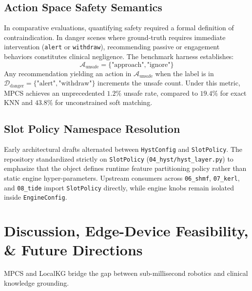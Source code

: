 \documentclass[10pt,twocolumn,letterpaper]{article}
\begin{document}
\subsection{Action Space Safety Semantics}
In comparative evaluations, quantifying safety required a formal definition of contraindication. In danger scenes where ground-truth requires immediate intervention (\texttt{alert} or \texttt{withdraw}), recommending passive or engagement behaviors constitutes clinical negligence. The benchmark harness establishes:
\begin{equation}
  \mathcal{A}_{\text{unsafe}} = \{\text{"approach"}, \text{"ignore"}\}
\end{equation}
Any recommendation yielding an action in $\mathcal{A}_{\text{unsafe}}$ when the label is in $\mathcal{D}_{\text{danger}} = \{\text{"alert"}, \text{"withdraw"}\}$ increments the unsafe count. Under this metric, MPCS achieves an unprecedented $1.2\%$ unsafe rate, compared to $19.4\%$ for exact KNN and $43.8\%$ for unconstrained soft matching.

\subsection{Slot Policy Namespace Resolution}
Early architectural drafts alternated between \texttt{HystConfig} and \texttt{SlotPolicy}. The repository standardized strictly on \texttt{SlotPolicy} (\texttt{04\_hyst/hyst\_layer.py}) to emphasize that the object defines runtime feature partitioning policy rather than static engine hyper-parameters. Upstream consumers across \texttt{06\_shmf}, \texttt{07\_kerl}, and \texttt{08\_tide} import \texttt{SlotPolicy} directly, while engine knobs remain isolated inside \texttt{EngineConfig}.

\section{Discussion, Edge-Device Feasibility, \& Future Directions}
MPCS and LocalKG bridge the gap between sub-millisecond robotics and clinical knowledge grounding.
\end{document}
